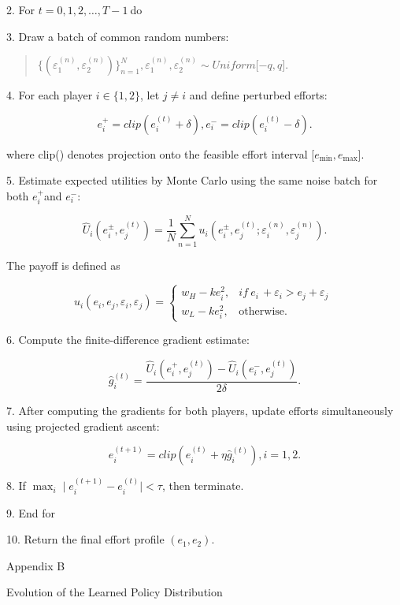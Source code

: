 \documentclass[
]{article}
\begin{document}
2. For \(t = 0,1,2,\ldots,T - 1\ \)do

3. Draw a batch of common random numbers:

\begin{quote}
\(\{\left( \varepsilon_{1}^{(n)},\varepsilon_{2}^{(n)} \right)\}_{n = 1}^{N},\varepsilon_{1}^{(n)},\varepsilon_{2}^{(n)} \sim Uniform\lbrack - q,q\rbrack\).
\end{quote}

4. For each player \(i \in \{ 1,2\}\), let \(j \neq i\) and define
perturbed efforts:

\[e_{i}^{+} = clip\left( e_{i}^{(t)} + \delta \right),e_{i}^{-} = clip(e_{i}^{(t)} - \delta).\]

where clip() denotes projection onto the feasible effort interval
{[}\(e_{\min},e_{\max}\){]}.

5. Estimate expected utilities by Monte Carlo using the same noise batch
for both \(e_{i}^{+}\)and \(e_{i}^{-}\):

\[{\widehat{U}}_{i}(e_{i}^{\pm},e_{j}^{(t)}) = \frac{1}{N}\sum_{n = 1}^{N}u_{i}(e_{i}^{\pm},e_{j}^{(t)};\varepsilon_{i}^{(n)},\varepsilon_{j}^{(n)}).\]

The payoff is defined as

\[u_{i}(e_{i},e_{j},\varepsilon_{i},\varepsilon_{j}) = \left\{ \begin{matrix}
w_{H} - ke_{i}^{2}, & if\ e_{i\ } + \varepsilon_{i} > e_{j} + \varepsilon_{j} \\
w_{L} - ke_{i}^{2}, & \text{otherwise.}
\end{matrix} \right.\ \]

6. Compute the finite-difference gradient estimate:

\[{\widehat{g}}_{i}^{(t)} = \frac{{\widehat{U}}_{i}(e_{i}^{+},e_{j}^{(t)}) - {\widehat{U}}_{i}(e_{i}^{-},e_{j}^{(t)})}{2\delta}.\]

7. After computing the gradients for both players, update efforts
simultaneously using projected gradient ascent:

\[e_{i}^{(t + 1)} = clip\left( e_{i}^{(t)} + \eta{\widehat{g}}_{i}^{(t)} \right),i = 1,2.\]

8. If \({\max}_{i} \mid e_{i}^{(t + 1)} - e_{i}^{(t)} \mid < \tau\),
then terminate.

9. End for

10. Return the final effort profile \((e_{1},e_{2})\).

Appendix B

Evolution of the Learned Policy Distribution
\end{document}
